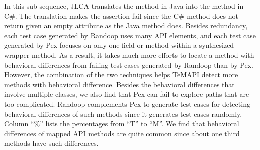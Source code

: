 In this sub-sequence, JLCA translates the  method in Java into the  method in C\#. The translation makes the assertion fail since the C\# method does not return  given an empty attribute as the Java method does. Besides redundancy, each test case generated by Randoop uses many API elements, and each test case generated by Pex focuses on only one field or method within a synthesized wrapper method. As a result, it takes much more efforts to locate a method with behavioral differences from failing test cases generated by Randoop than by Pex. However, the combination of the two techniques helps TeMAPI detect more methods with behavioral difference. Besides the behavioral differences that involve multiple classes, we also find that Pex can fail to explore paths that are too complicated. Randoop complements Pex to generate test cases for detecting behavioral differences of such methods since it generates test cases randomly. Column ``\%'' lists the percentages from ``T'' to ``M''. We find that behavioral differences of mapped API methods are quite common since about one third methods have such differences.

